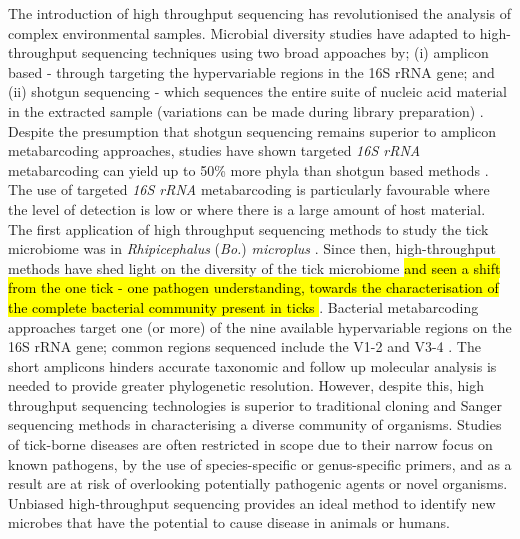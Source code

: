 \documentclass[a4paper, nobind]{templates/ociamthesis}
\begin{document}
The introduction of high throughput sequencing has revolutionised the analysis of complex environmental samples.
Microbial diversity studies have adapted to high-throughput sequencing techniques using two broad appoaches by; (i) amplicon based - through targeting the hypervariable regions in the 16S rRNA gene; and (ii) shotgun sequencing - which sequences the entire suite of nucleic acid material in the extracted sample (variations can be made during library preparation) \autocite{liuPracticalGuideAmplicon2020,bhartiCurrentChallengesBestpractice2021}.
Despite the presumption that shotgun sequencing remains superior to amplicon metabarcoding approaches, studies have shown targeted \emph{16S rRNA} metabarcoding can yield up to 50\% more phyla than shotgun based methods \autocite{tesslerLargescaleDifferencesMicrobial2017}.
The use of targeted \emph{16S rRNA} metabarcoding is particularly favourable where the level of detection is low or where there is a large amount of host material.
The first application of high throughput sequencing methods to study the tick microbiome was in \emph{Rhipicephalus} (\emph{Bo.}) \emph{microplus} \autocite{andreottiAssessmentBacterialDiversity2011}.
Since then, high-throughput methods have shed light on the diversity of the tick microbiome \autocite{greayRecentInsightsTick2018} \hl{and seen a shift from the one tick - one pathogen understanding, towards the characterisation of the complete bacterial community present in ticks \autocite{moutaillerCoinfectionTicksRule2016}}.
Bacterial metabarcoding approaches target one (or more) of the nine available hypervariable regions on the 16S rRNA gene; common regions sequenced include the V1-2 and V3-4 \autocite{barbDevelopmentAnalysisPipeline2016,yangSensitivityCorrelationHypervariable2016,sperlingComparisonBacterial16S2017}.
The short amplicons hinders accurate taxonomic and follow up molecular analysis is needed to provide greater phylogenetic resolution.
However, despite this, high throughput sequencing technologies is superior to traditional cloning and Sanger sequencing methods in characterising a diverse community of organisms.
Studies of tick-borne diseases are often restricted in scope due to their narrow focus on known pathogens, by the use of species-specific or genus-specific primers, and as a result are at risk of overlooking potentially pathogenic agents or novel organisms.
Unbiased high-throughput sequencing provides an ideal method to identify new microbes that have the potential to cause disease in animals or humans.
\end{document}
